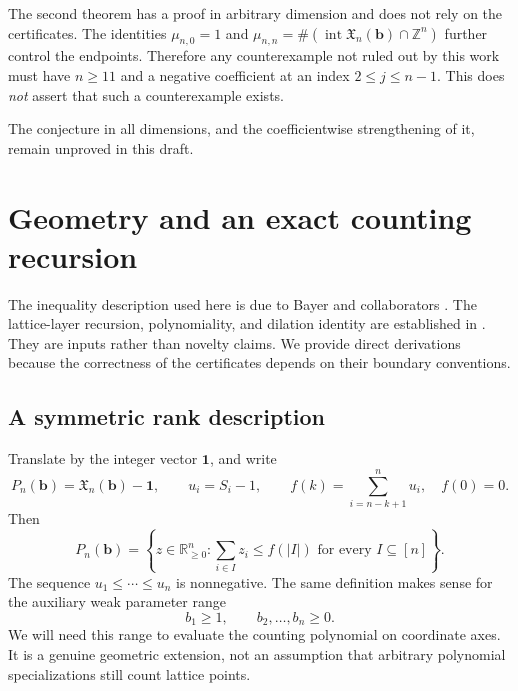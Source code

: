 \documentclass[11pt]{article}
\theoremstyle{definition}
\newcommand{\Z}{\mathbb Z}
\newcommand{\R}{\mathbb R}
\newcommand{\bb}{\mathbf b}
\newcommand{\one}{\mathbf 1}
\newcommand{\X}{\mathfrak X}
\newcommand{\interior}{\operatorname{int}}
\numberwithin{equation}{section}
\begin{document}
The second theorem has a proof in arbitrary dimension and does not rely on
the certificates. The identities $\mu_{n,0}=1$ and
$\mu_{n,n}=\#(\interior\X_n(\bb)\cap\Z^n)$ further control the endpoints.
Therefore any counterexample not ruled out by this work must have
$n\ge11$ and a negative coefficient at an index $2\le j\le n-1$.
This does \emph{not} assert that such a counterexample exists.

The conjecture in all dimensions, and the coefficientwise strengthening of
it, remain unproved in this draft.

\section{Geometry and an exact counting recursion}
\label{sec:geometry}

The inequality description used here is due to Bayer and collaborators
\cite[Theorem~2.3]{Bayer}. The lattice-layer recursion, polynomiality, and
dilation identity are established in \cite[Theorem~3.5, Theorem~4.1,
Proposition~5.4, and Section~5]{HLTV}. They are inputs rather than novelty
claims. We provide direct derivations because the correctness of the
certificates depends on their boundary conventions.

\subsection{A symmetric rank description}
Translate by the integer vector $\one$, and write
\[
 P_n(\bb)=\X_n(\bb)-\one,\qquad u_i=S_i-1,
 \qquad f(k)=\sum_{i=n-k+1}^n u_i,\quad f(0)=0.
\]
Then
\begin{equation}
 P_n(\bb)=\left\{z\in\R_{\ge0}^n:
       \sum_{i\in I}z_i\le f(|I|)\text{ for every }I\subseteq[n]\right\}.
 \label{eq:rank-polytope}
\end{equation}
The sequence $u_1\le\cdots\le u_n$ is nonnegative. The same definition makes
sense for the auxiliary weak parameter range
\begin{equation}
 b_1\ge1,\qquad b_2,\ldots,b_n\ge0.
 \label{eq:weak}
\end{equation}
We will need this range to evaluate the counting polynomial on coordinate
axes. It is a genuine geometric extension, not an assumption that arbitrary
polynomial specializations still count lattice points.
\end{document}
